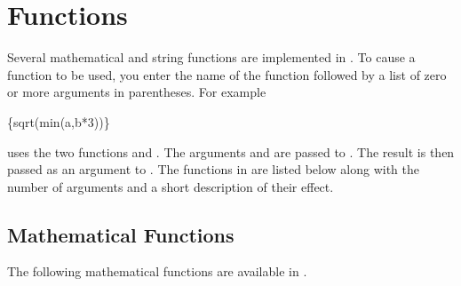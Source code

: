 \chapter{Functions}\label{ch:functions}

Several mathematical and string functions are implemented in
\aprepro{}.  To cause a function to be used, you enter the name
of the function followed by a list of zero or more arguments in
parentheses. For example
\begin{apinp}
\{sqrt(min(a,b*3))\}
\end{apinp}
uses the two functions  and . The arguments  
and  are passed to . The result is then passed as an 
argument to . The functions in \aprepro{} are listed below 
along with the number of arguments and a short description of their effect.

\section{Mathematical Functions}

The following mathematical functions are available in \aprepro{}.

